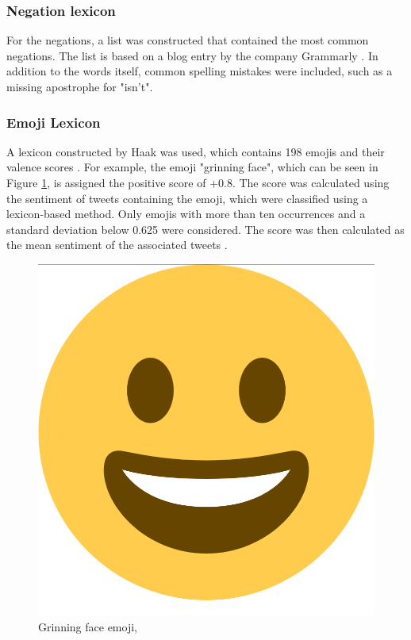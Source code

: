 \subsubsection{Negation lexicon}
For the negations, a list was constructed that contained the most common negations. The list is based on a blog entry by the company Grammarly \cite{negations}. In addition to the words itself, common spelling mistakes were included, such as a missing apostrophe for "isn't".

\subsubsection{Emoji Lexicon}
A lexicon constructed by Haak was used, which contains 198 emojis and their valence scores \cite{haak_dataset}. For example, the emoji "grinning face", which can be seen in Figure \ref{fig:emoji}, is assigned the positive score of +0.8. The score was calculated using the sentiment of tweets containing the emoji, which were classified using a lexicon-based method. Only emojis with more than ten occurrences and a standard deviation below 0.625 were considered. The score was then calculated as the mean sentiment of the associated tweets \cite{haak_article}.

\begin{figure}
    \centering
    \includegraphics[scale=0.05]{Images/emoji_smile.png}
    \caption{Grinning face emoji, }
    \label{fig:emoji}
\end{figure}



